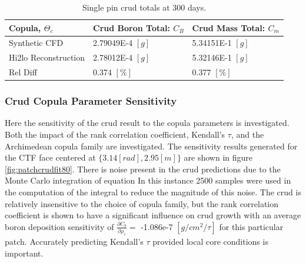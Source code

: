 \begin{table}[h]
    \begin{center}
        \caption[Crud totals for synthetic and hi2lo models.]{Single pin crud totals at 300 days.}
        \begin{tabular}[h]{|l | l | l |}
            \hline
            Copula, $\Theta_c$ & Crud Boron Total: $C_B$ & Crud Mass Total: $C_m$ \\
            \hline  \hline
            Synthetic CFD &  2.79049E-4 $[g]$ & 5.34151E-1 $[g]$ \\
            Hi2lo Reconstruction &  2.78012E-4  $[g]$ & 5.32146E-1 $[g]$ \\
            \hline
            Rel Diff &  0.374 $[\%]$ & 0.377 $[\%]$ \\
            \hline
        \end{tabular}
        \label{tab:crud_totals_2}
    \end{center}
\end{table}



\subsubsection{Crud Copula Parameter Sensitivity}
\label{sec:crud_copula_sensi}

Here the sensitivity of the crud result to the copula parameters is investigated.  Both the impact of the rank correlation coefficient, Kendall's $\tau$, and the Archimedean copula family are investigated.  The sensitivity results generated for the CTF face centered at $\{3.14[rad], 2.95[m]\}$ are shown in figure \ref{fig:patchcrudfit80}.  There is noise present in the crud predictions due to the Monte Carlo integration of equation %
In this instance 2500 samples were used in the computation of the integral to reduce the magnitude of this noise.  The crud is relatively insensitive to the choice of copula family, but the rank correlation coefficient is shown to have a significant influence on crud growth with an average boron deposition sensitivity of $\frac{\partial C_b}{\partial \rho_\tau} =$ -1.086e-7 $[g/cm^2/\tau]$ for this particular patch.  Accurately predicting Kendall's $\tau$ provided local core conditions is important.

